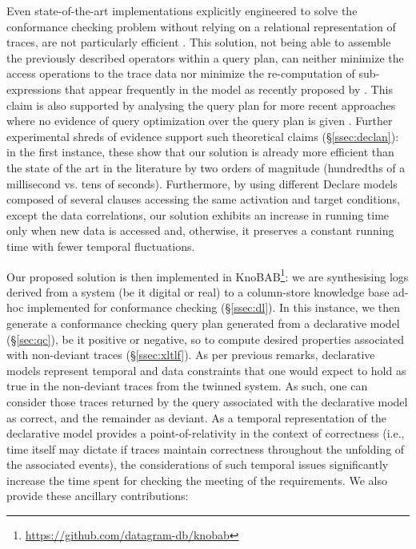Even state-of-the-art implementations explicitly engineered to solve the conformance checking problem without relying on a 
relational representation of traces, are not particularly efficient \cite{BurattinMS16}. This solution, not being able to assemble the previously described \LTLf operators within a query plan, can neither minimize the access operations to the trace data nor  minimize the re-computation of sub-expressions that appear frequently in the model as recently proposed by \cite{BellatrecheKB21}. This claim is also supported by analysing the query plan for more recent approaches where no evidence of query optimization over the query plan is given \cite{Polyvyanyy2022,MurillasRA22}. Further experimental shreds of evidence support such theoretical claims (\S\ref{ssec:declan}): in the first instance, these show that our solution is already more efficient than the state of the art in the literature by two orders of magnitude (hundredths of a millisecond vs. tens of seconds). Furthermore, by using different Declare models composed of several clauses accessing the same activation and target conditions, except the data correlations, our solution exhibits an increase in running time only when new data is accessed and, otherwise, it preserves a constant running time with fewer temporal fluctuations.

Our proposed solution is then implemented in KnoBAB\footnote{\url{https://github.com/datagram-db/knobab}}: we are synthesising logs derived from a system (be it digital or real) to a column-store knowledge base ad-hoc implemented for conformance checking (\S\ref{ssec:dl}). In this instance, we then generate a conformance checking query plan generated from a declarative model (\S\ref{sec:qc}), be it positive or negative, so to compute desired properties associated with non-deviant traces (\S\ref{ssec:xltlf}). As per previous remarks, declarative models represent temporal and data constraints that one would expect to hold as true in the non-deviant traces from the twinned system. As such, one can consider those traces returned by the query associated with the declarative model as correct, and the remainder as deviant. As a temporal representation of the declarative model provides a point-of-relativity in the context of correctness (i.e., time itself may dictate if traces maintain correctness throughout the unfolding of the associated events), the considerations of such temporal issues significantly increase the time spent for checking the meeting of the requirements.   We also provide these ancillary contributions: 

